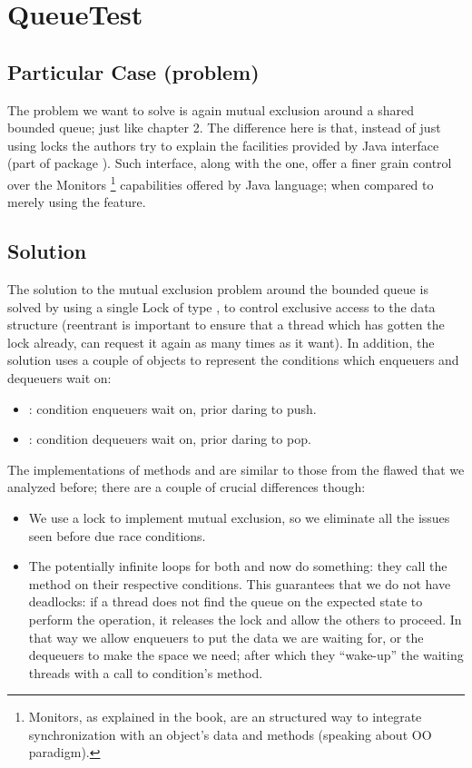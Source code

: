 \section{\textbf{QueueTest}}

\subsection{Particular Case (problem)}
The problem we want to solve is again mutual exclusion around a shared
bounded queue; just like chapter 2. The difference here is that, instead of
just using locks the authors try to explain the facilities provided by
Java  interface (part of package
). Such interface, along with the
 one, offer a finer grain control over the
Monitors \footnote{Monitors, as explained in the book, are an
  structured way to integrate synchronization with an object's data
  and methods (speaking about OO paradigm).}
capabilities offered by Java language; when compared to merely using
the  feature. 

\subsection{Solution}
The solution to the mutual exclusion problem around the bounded queue is
solved by using a single Lock of type , to control
exclusive access to the data structure (reentrant is important to
ensure that a thread which has gotten the lock already, can request it
again as many times as it want). In addition, the solution uses a
couple of  objects to represent the conditions 
which enqueuers and dequeuers wait on: \\

\begin{itemize}
  \item {}: condition enqueuers wait on, prior daring to push.
  \item {}: condition dequeuers wait on, prior daring to pop.
\end{itemize}
\hfill

The implementations of methods  and  are similar to
those from the flawed  that we analyzed before; there
are a couple of crucial differences though: \\

\begin{itemize}
\item We use a lock to implement mutual exclusion, so we eliminate all
  the issues seen before due race conditions.
\item The potentially infinite loops for both  and  now
  do something: they call the  method on their respective
  conditions. This guarantees that we do not have deadlocks: if a
  thread does not find the queue on the expected state to perform the
  operation, it releases the lock and allow the others to proceed. In
  that way we allow enqueuers to put the data we are waiting for, or
  the dequeuers to make the space we need; after which they
  ``wake-up'' the waiting threads with a call to condition's
   method. 
\end{itemize}
\hfill

